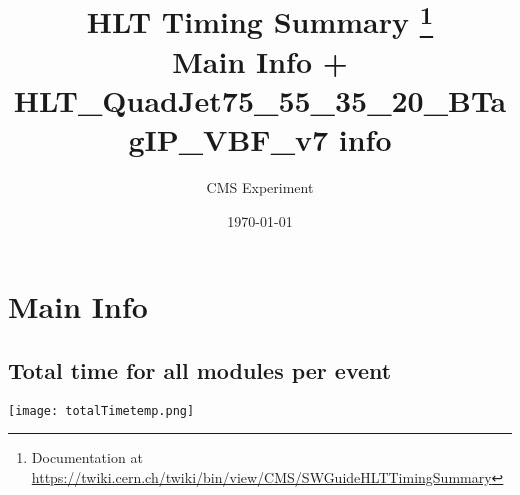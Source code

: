 \documentclass[10pt,a5paper,landscape]{report}
\title{ \textbf{\Huge{HLT Timing Summary}} \footnote{\large{Documentation at \url{https://twiki.cern.ch/twiki/bin/view/CMS/SWGuideHLTTimingSummary}}} \\ Main Info + HLT\_QuadJet75\_55\_35\_20\_BTagIP\_VBF\_v7 info }
\author{\Large{CMS Experiment}}
\date{\today}
\begin{document}
\maketitle
\tableofcontents 
\newpage
 \chapter{Main Info} 
\newpage \centering \section{Total time for all modules per event} \texttt{[image: totalTimetemp.png]}
\end{document}

